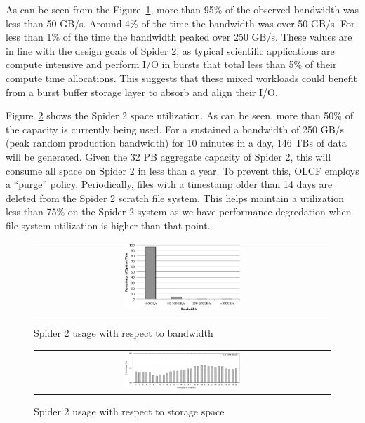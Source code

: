As can be seen from the Figure~\ref{fig:bwUsage}, more than 95\% of the 
observed bandwidth was less than 50 GB/s. Around 4\% of the time the bandwidth
was over 50 GB/s. For less than 1\% of the time the bandwidth peaked over
250 GB/s. These values are in line with the design goals of Spider 2, as
typical scientific applications are compute intensive and perform
I/O in bursts that total less than 5\% of their compute time allocations. This suggests that these 
mixed workloads could benefit from a burst buffer storage layer to absorb and align 
their I/O.

Figure~\ref{fig:storageUsage} shows the Spider 2 space utilization. As can be
seen, more than 50\% of the capacity is currently being used.  For a sustained a
bandwidth of 250 GB/s (peak random production bandwidth) for 10 minutes in a
day, 146 TBs of data will be generated. Given the 32 PB aggregate capacity of
Spider 2, this will consume all space on Spider 2 in less than a year. To
prevent this, OLCF employs a ``purge'' policy. Periodically, files with a
timestamp older than 14 days are deleted from the Spider 2 scratch file system.
This helps maintain a utilization less than 75\% on the Spider 2 system as we 
have performance degredation when file system utilization is higher than that 
point.  

\begin{figure}[!thb]
\begin{center}
\begin{tabular}{c}
{\includegraphics[width=0.40\textwidth]{./figs/bwUsage.eps}}\\
\end{tabular}
\vspace{-0.1in}
\caption{Spider 2 usage with respect to bandwidth}
\label{fig:bwUsage}
\end{center}
\end{figure}



\begin{figure}[!thb]
\begin{center}
\begin{tabular}{c}
{\includegraphics[width=0.40\textwidth]{./figs/storageUsage.eps}}\\
\end{tabular}
\vspace{-0.1in}
\caption{Spider 2 usage with respect to storage space}
\label{fig:storageUsage}
\end{center}
\end{figure}


